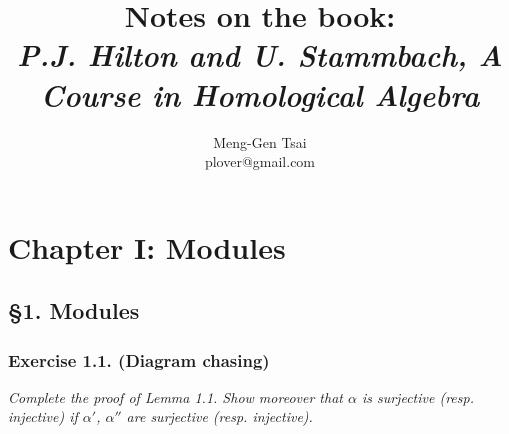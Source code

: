 \documentclass{article}
\title{\textbf{Notes on the book: \\ \emph{P.J. Hilton and U. Stammbach, A Course in Homological Algebra}}}
\author{Meng-Gen Tsai \\ plover@gmail.com}
\begin{document}
\maketitle
\tableofcontents












\newpage
\section*{Chapter I: Modules \\}



\subsection*{\S 1. Modules \\}



\subsubsection*{Exercise 1.1. (Diagram chasing)}
\emph{Complete the proof of Lemma 1.1.
Show moreover that $\alpha$ is surjective (resp. injective) if
$\alpha'$, $\alpha''$ are surjective (resp. injective).} \\
\end{document}
